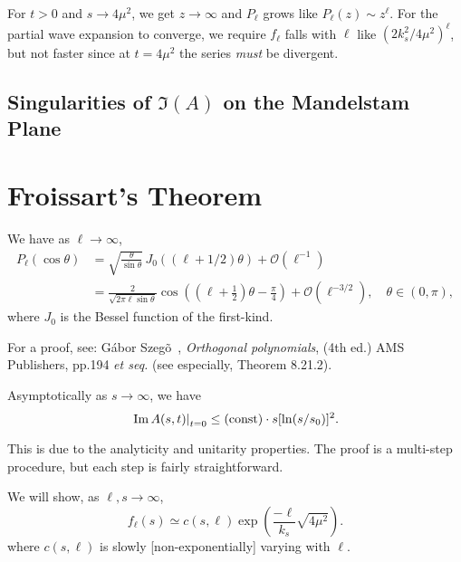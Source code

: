 \M
For $t>0$ and $s\to4\mu^{2}$, we get $z\to\infty$ and $P_{\ell}$ grows
like $P_{\ell}(z)\sim z^{\ell}$. For the partial wave expansion to
converge, we require $f_{\ell}$ falls with $\ell$ like
$(2k_{s}^{2}/4\mu^{2})^{\ell}$, but not faster since at $t=4\mu^{2}$ the
series \emph{must} be divergent.

\subsection{Singularities of $\Im(A)$ on the Mandelstam Plane}


\section{Froissart's Theorem}

\begin{lemma}
We have as $\ell\to\infty$,
\begin{subequations}
  \begin{align}
  P_\ell (\cos \theta) &= \sqrt{\frac{\theta}{\sin \theta}} \, J_0((\ell+1/2)\theta) + \mathcal{O}\left(\ell^{-1}\right) \\
&= \frac{2}{\sqrt{2\pi \ell\sin\theta}}\cos\left(\left(\ell + \tfrac12\right)\theta - \frac{\pi}{4}\right) + \mathcal{O}\left(\ell^{-3/2}\right), \quad \theta \in (0,\pi),
\end{align}
\end{subequations}
where $J_{0}$ is the Bessel function of the first-kind.
\end{lemma}

For a proof, see:
G\'abor Szeg\~o~\cite{szego},
\emph{Orthogonal polynomials}, (4th ed.) AMS Publishers, pp.194
\emph{et seq.} (see especially, Theorem 8.21.2).

\begin{theorem}[Froissart]
  Asymptotically as $s\to\infty$, we have
  \begin{equation}
\left.\operatorname{Im}A(s,t)\right|_{t=0}\leq(\mbox{const})\cdot s[\ln(s/s_{0})]^{2}.
  \end{equation}
\end{theorem}

This is due to the analyticity and unitarity properties. The proof is a
multi-step procedure, but each step is fairly straightforward.

We will show, as $\ell,s\to\infty$,
\begin{equation}
f_{\ell}(s)\simeq c(s,\ell)\exp\left(\frac{-\ell}{k_{s}}\sqrt{4\mu^{2}}\right).
\end{equation}
where $c(s,\ell)$ is slowly [non-exponentially] varying with $\ell$.

